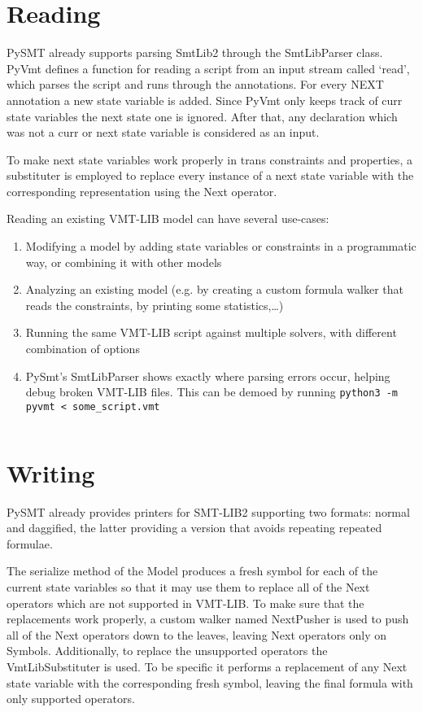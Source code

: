\section{Reading}
PySMT already supports parsing SmtLib2 through the SmtLibParser class.
PyVmt defines a function for reading a script from an input stream called `read', which parses the script and runs through the annotations.
For every NEXT annotation a new state variable is added. Since PyVmt only keeps track of curr state variables the next state one is ignored.
After that, any declaration which was not a curr or next state variable is considered as an input.

To make next state variables work properly in trans constraints and properties, a substituter is employed to replace every instance of a next state variable with the corresponding representation using the Next operator.

Reading an existing VMT-LIB model can have several use-cases:
\begin{enumerate}
    \item Modifying a model by adding state variables or constraints in a programmatic way, or combining it with other models
    \item Analyzing an existing model (e.g. by creating a custom formula walker that reads the constraints, by printing some statistics,\dots)
    \item Running the same VMT-LIB script against multiple solvers, with different combination of options
    \item PySmt's SmtLibParser shows exactly where parsing errors occur, helping debug broken VMT-LIB files. This can be demoed by running \texttt{python3 -m pyvmt < some_script.vmt}
\end{enumerate}
\inputminted[firstline=11, lastline=34]{python3}{py/vmtlib_support.py}

\section{Writing}
PySMT already provides printers for SMT-LIB2 supporting two formats: normal and daggified, the latter providing a version that avoids repeating repeated formulae.

The serialize method of the Model produces a fresh symbol for each of the current state variables so that it may use them to replace all of the Next operators which are not supported in VMT-LIB.
To make sure that the replacements work properly, a custom walker named NextPusher is used to push all of the Next operators down to the leaves, leaving Next operators only on Symbols.
Additionally, to replace the unsupported operators the VmtLibSubstituter is used. To be specific it performs a replacement of any Next state variable with the corresponding fresh symbol, leaving the final formula with only supported operators.

